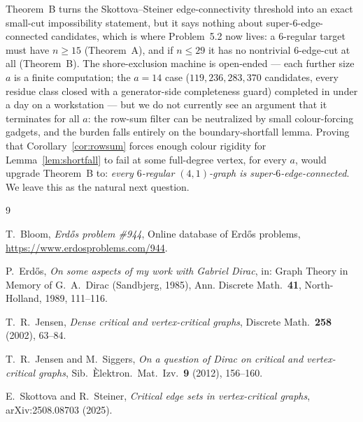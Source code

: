 \documentclass[11pt]{article}
\theoremstyle{remark}
\begin{document}
Theorem~B turns the Skottova--Steiner edge-connectivity threshold into an exact
small-cut impossibility statement, but it says nothing about
super-$6$-edge-connected candidates, which is where Problem~5.2 now lives: a
$6$-regular target must have $n\ge 15$ (Theorem~A), and if $n\le 29$ it has no
nontrivial $6$-edge-cut at all (Theorem~B). The shore-exclusion machine is
open-ended --- each further size $a$ is a finite computation; the $a=14$ case
($119{,}236{,}283{,}370$ candidates, every residue class closed with a
generator-side completeness guard) completed in under a day on a workstation --- but we
do not currently see an argument that it terminates for all $a$: the row-sum
filter can be neutralized by small colour-forcing gadgets, and the burden falls
entirely on the boundary-shortfall lemma. Proving that
Corollary~\ref{cor:rowsum} forces enough colour rigidity for
Lemma~\ref{lem:shortfall} to fail at some full-degree vertex, for every $a$,
would upgrade Theorem~B to: \emph{every $6$-regular $(4,1)$-graph is
super-$6$-edge-connected}. We leave this as the natural next question.

\begin{thebibliography}{9}

 T.~Bloom, \emph{Erd\H{o}s problem \#944}, Online database of
Erd\H{o}s problems, \url{https://www.erdosproblems.com/944}.

 P.~Erd\H{o}s, \emph{On some aspects of my work with Gabriel
Dirac}, in: Graph Theory in Memory of G.~A.~Dirac (Sandbjerg, 1985), Ann.
Discrete Math.\ \textbf{41}, North-Holland, 1989, 111--116.

 T.~R.~Jensen, \emph{Dense critical and vertex-critical graphs},
Discrete Math.\ \textbf{258} (2002), 63--84.

 T.~R.~Jensen and M.~Siggers, \emph{On a question of Dirac on
critical and vertex-critical graphs}, Sib.\ \`Elektron.\ Mat.\ Izv.\ \textbf{9}
(2012), 156--160.

 E.~Skottova and R.~Steiner, \emph{Critical edge sets in
vertex-critical graphs}, arXiv:2508.08703 (2025).

\end{thebibliography}
\end{document}
